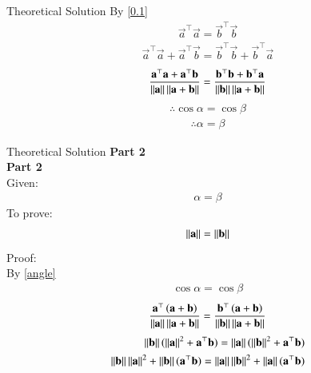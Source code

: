 \documentclass{beamer}
\begin{document}
	\begin{frame}{Theoretical Solution}
		By \eqref{0.1}
	\begin{align}
		\vec{a}^\top\vec{a} = \vec{b}^\top\vec{b}
	\end{align}
	\begin{align}
		\vec{a}^\top\vec{a} + \vec{a}^\top\vec{b} = \vec{b}^\top\vec{b} + \vec{b}^\top\vec{a}
	\end{align}
	\begin{align}
		\frac{\mathbf{a}^\top\mathbf{a} + \mathbf{a}^\top\mathbf{b}}{\left\lVert\mathbf{a}\right\rVert\left\lVert\mathbf{a}+\mathbf{b}\right\rVert} = \frac{\mathbf{b}^\top\mathbf{b} + \mathbf{b}^\top\mathbf{a}}{\left\lVert\mathbf{b}\right\rVert\left\lVert\mathbf{a}+\mathbf{b}\right\rVert}
	\end{align}
	\begin{align}
		\therefore \cos\alpha=	\cos\beta   \label{angle}
	\end{align}	
	\begin{align}
		\therefore	\alpha=\beta
	\end{align}	
	\end{frame}
	\begin{frame}{Theoretical Solution}
			\textbf{Part 2}\\
		\textbf{Part 2}\\
	Given:
	\begin{align}
		\alpha=\beta
	\end{align}
	To prove:
	\begin{align}
		\left\lVert\mathbf{a}\right\rVert = \left\lVert\mathbf{b}\right\rVert 
	\end{align}
	Proof:\\
	By \eqref{angle}
	\begin{align}
		\cos{\alpha}=\cos{\beta}
	\end{align}
	\begin{align}
		\frac{\mathbf{a}^\top\left(\mathbf{a}+\mathbf{b}\right)}{\left\lVert\mathbf{a}\right\rVert\left\lVert\mathbf{a}+\mathbf{b}\right\rVert} = \frac{\mathbf{b}^\top\left(\mathbf{a}+\mathbf{b}\right)}{\left\lVert\mathbf{b}\right\rVert\left\lVert\mathbf{a}+\mathbf{b}\right\rVert}
	\end{align}
	\begin{align}
		\left\lVert\mathbf{b}\right\rVert (\left\lVert\mathbf{a}\right\rVert^2 + \mathbf{a}^\top\mathbf{b}) = \left\lVert\mathbf{a}\right\rVert (\left\lVert\mathbf{b}\right\rVert^2 + \mathbf{a}^\top\mathbf{b}) \\
		\left\lVert\mathbf{b}\right\rVert\left\lVert\mathbf{a}\right\rVert^2 + \left\lVert\mathbf{b}\right\rVert(\mathbf{a}^\top\mathbf{b}) = \left\lVert\mathbf{a}\right\rVert\left\lVert\mathbf{b}\right\rVert^2 + \left\lVert\mathbf{a}\right\rVert(\mathbf{a}^\top\mathbf{b})
	\end{align}
	\end{frame}
\end{document}
